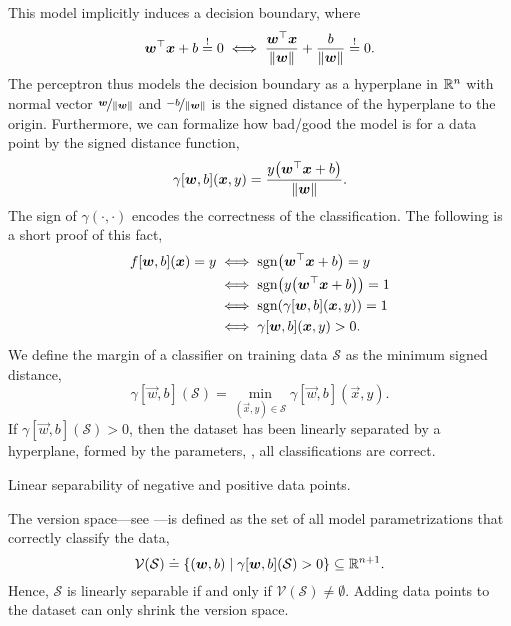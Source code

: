 This model implicitly induces a decision boundary, where \[
    \transpose{\vec{w}} \vec{x} + b \condeq 0 \iff \frac{\transpose{\vec{w}}\vec{x}}{\| \vec{w} \|} + \frac{b}{\| \vec{w} \|} \condeq 0.
\]
The perceptron thus models the decision boundary as a hyperplane in $\R^n$ with normal vector
$\nicefrac{\vec{w}}{\| \vec{w} \|}$ and $\nicefrac{-b}{\| \vec{w} \|}$ is the signed distance of
the hyperplane to the origin.
Furthermore, we can formalize how bad/good the model is for a data point by the signed distance
function, \[
    \gamma[\vec{w}, b](\vec{x}, y) = \frac{y \lft( \transpose{\vec{w}} \vec{x} + b \rgt)}{\| \vec{w} \|}.
\]
The sign of $\gamma(\cdot, \cdot)$ encodes the correctness of the classification. The following is
a short proof of this fact,
\begin{align*}
    f[\vec{w}, b](\vec{x}) = y & \iff \mathrm{sgn}\lft( \transpose{\vec{w}} \vec{x} + b \rgt) = y               \\
                               & \iff \mathrm{sgn}\lft( y \lft( \transpose{\vec{w}} \vec{x} + b \rgt) \rgt) = 1 \\
                               & \iff \mathrm{sgn}\lft( \gamma[\vec{w}, b](\vec{x}, y) \rgt) = 1                \\
                               & \iff \gamma[\vec{w}, b](\vec{x}, y) > 0.
\end{align*}
We define the margin of a classifier on training data $\mathcal{S}$ as the minimum signed distance, \[
    \gamma[\vec{w}, b](\mathcal{S}) = \min_{(\vec{x}, y) \in \mathcal{S}} \gamma[\vec{w},b](\vec{x}, y).
\]
If $\gamma[\vec{w},b](\mathcal{S}) > 0$, then the dataset has been linearly separated by a
hyperplane, formed by the parameters, \ie, all classifications are correct.

\begin{marginfigure}
    \centering
    \caption{Linear separability of negative and positive data points.}
    \label{fig:linear-separability}
\end{marginfigure}

The version space---see ---is defined as the set of all model
parametrizations that correctly classify the data, \[
    \mathcal{V}(\mathcal{S}) \doteq \{ (\vec{w}, b) \mid \gamma[\vec{w}, b](\mathcal{S}) > 0 \} \subseteq \R^{n+1}.
\]
Hence, $\mathcal{S}$ is linearly separable if and only if $\mathcal{V}(\mathcal{S}) \neq
    \emptyset$. Adding data points to the dataset can only shrink the version space.

